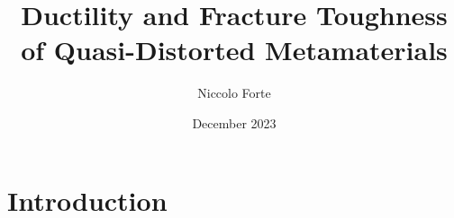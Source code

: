 \documentclass{article}
\title{Ductility and Fracture Toughness of Quasi-Distorted Metamaterials}
\author{Niccolo Forte }
\date{December 2023}
\begin{document}
\maketitle

\section{Introduction}
\end{document}

